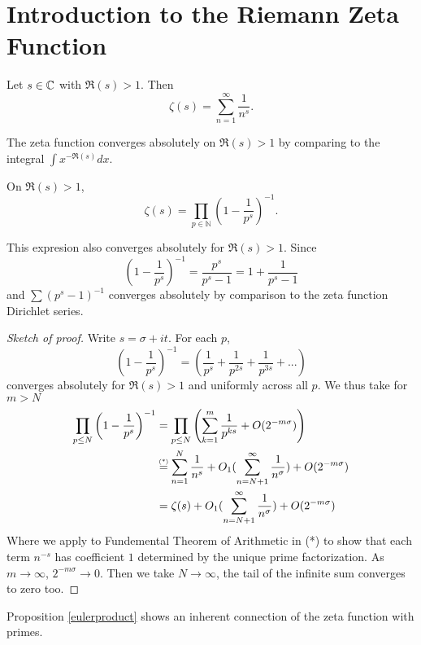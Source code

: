 \section{Introduction to the Riemann Zeta Function}

\begin{definition}
	Let $s\in\mathbb{C}$ with $\Re(s)>1$. Then \begin{equation}
	\zeta(s)=\sum_{n=1}^{\infty}\frac{1}{n^s}.
	\end{equation}
\end{definition}
The zeta function converges absolutely on $\Re(s)>1$ by comparing to the integral $\int x^{-\Re(s)} dx$.
\begin{proposition}\label{eulerproduct}
	On $\Re(s)>1$, \begin{equation}
		\zeta(s) = \prod_{p\in\mathbb{N}}\left(1-\frac{1}{p^s}\right)^{-1}.	
	\end{equation}
\end{proposition}
\begin{remark}
	This expresion also converges absolutely for $\Re(s)>1$. Since \[
		\left(1-\frac{1}{p^s}\right)^{-1} = \frac{p^s}{p^s-1} = 1 + \frac{1}{p^s-1}
	\]
	and $\sum(p^s-1)^{-1}$ converges absolutely by comparison to the zeta function Dirichlet series.
\end{remark}
\begin{proof}[Sketch of proof]
	Write $s=\sigma+it$. For each $p$,\[
		\left(1-\frac{1}{p^s}\right)^{-1} = \left(\frac{1}{p^s}+\frac{1}{p^{2s}}+\frac{1}{p^{3s}}+...\right)
	\]
	converges absolutely for $\Re(s)>1$ and uniformly across all $p$. We thus take for $m>N$ \begin{align*}
		\prod_{p\leq N}\left(1-\frac{1}{p^s}\right)^{-1}  &= \prod_{p\leq N}\left(\sum_{k=1}^{m} \frac{1}{p^{ks}}+O(2^{-m\sigma})\right)\\
		&\stackeq{(*)}\sum_{n=1}^{N}\frac{1}{n^s}+O_1(\sum_{n=N+1}^{\infty} \frac{1}{n^\sigma}) + O(2^{-m\sigma})\\
		&=\zeta(s) + O_1(\sum_{n=N+1}^{\infty} \frac{1}{n^\sigma}) + O(2^{-m\sigma})
	\end{align*}
	Where we apply to Fundemental Theorem of Arithmetic in (*) to show that each term $n^{-s}$ has coefficient $1$ determined by the unique prime factorization.
	As $m\to\infty$, $2^{-m\sigma} \to 0$. Then we take $N\to\infty$, the tail of the infinite sum converges to zero too.
\end{proof}
Proposition \ref{eulerproduct} shows an inherent connection of the zeta function with primes.
